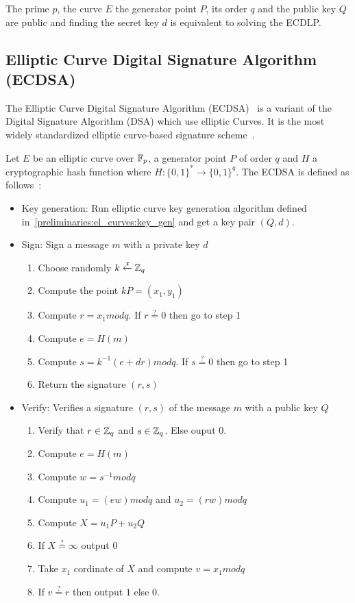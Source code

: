 The prime $p$, the curve $E$ the generator point $P$, its order $q$ and the public key $Q$ are public and finding the secret key $d$ is equivalent to solving the ECDLP.

\subsection{Elliptic Curve Digital Signature Algorithm (ECDSA)}
\label{preliminaries:sign:el_curves:ecdsa}

The Elliptic Curve Digital Signature Algorithm (ECDSA)~\cite{ecdsa} is a variant of the Digital Signature Algorithm (DSA) which use elliptic Curves. It is the most widely standardized elliptic curve-based signature scheme~\cite{elliptic_curves_2}.

Let $E$ be an elliptic curve over $\mathbb{F}_p$, a generator point $P$ of order $q$ and $H$ a cryptographic hash function where $H: \{0, 1\}^{*} \rightarrow  \{0, 1\}^{q}$. The ECDSA is defined as follows~\cite{elliptic_curves_2}:

\begin{itemize}
  \item Key generation: Run elliptic curve key generation algorithm defined in~\ref{preliminaries:el_curves:key_gen} and get a key pair $(Q, d)$.
  \item Sign: Sign a message $m$ with a private key $d$
    \begin{enumerate}
      \item Choose randomly $k \xleftarrow{\mathtt{r}}{\mathbb{Z}_q}$
      \item Compute the point $kP = (x_1, y_1)$
      \item Compute $r = x_1modq$. If $r \stackrel{?}{=} 0$ then go to step 1
      \item Compute $e = H(m)$
      \item Compute $s = k^{-1} (e + dr) modq$. If $s \stackrel{?}{=} 0$ then go to step 1
      \item Return the signature $(r, s)$
    \end{enumerate}
  \item Verify: Verifies a signature $(r, s)$ of the message $m$ with a public key $Q$
    \begin{enumerate}
      \item Verify that $r \in \mathbb{Z}_q$ and $s \in \mathbb{Z}_q$. Else ouput $0$.
      \item Compute $e = H(m)$
      \item Compute $w = s^{-1}modq$
      \item Compute $u_1 = (ew)modq$ and $u_2 = (rw)modq$
      \item Compute $X = u_1P + u_2Q$
      \item If $X \stackrel{?}{=} \infty$ output $0$
      \item Take $x_1$ cordinate of $X$ and compute $v = x_1modq$
      \item If $v \stackrel{?}{=} r$ then output $1$ else $0$.
    \end{enumerate}
\end{itemize}

